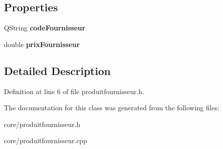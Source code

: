 \subsection*{Properties}
\begin{DoxyCompactItemize}
\item 
\hypertarget{class_produit_fournisseur_a4292080c383cb8c3f020ef6587e35374}{
QString {\bfseries codeFournisseur}}
\label{class_produit_fournisseur_a4292080c383cb8c3f020ef6587e35374}

\item 
\hypertarget{class_produit_fournisseur_a11a5ae56e13eedfdbc5bd56b091785b6}{
double {\bfseries prixFournisseur}}
\label{class_produit_fournisseur_a11a5ae56e13eedfdbc5bd56b091785b6}

\end{DoxyCompactItemize}


\subsection{Detailed Description}


Definition at line 6 of file produitfournisseur.h.



The documentation for this class was generated from the following files:\begin{DoxyCompactItemize}
\item 
core/produitfournisseur.h\item 
core/produitfournisseur.cpp\end{DoxyCompactItemize}
